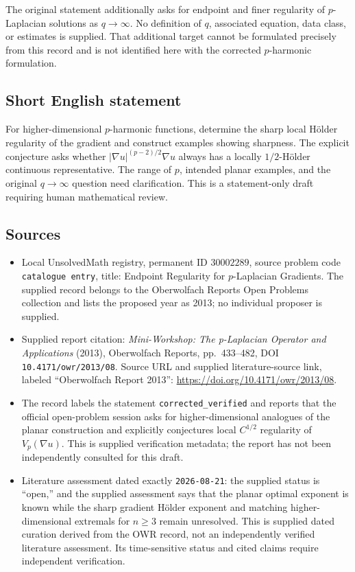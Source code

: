 \documentclass[11pt]{article}
\begin{document}
The original statement additionally asks for endpoint and finer regularity of \(p\)-Laplacian solutions as \(q\to\infty\). No definition of \(q\), associated equation, data class, or estimates is supplied. That additional target cannot be formulated precisely from this record and is not identified here with the corrected \(p\)-harmonic formulation.
\subsection{Short English statement}
For higher-dimensional \(p\)-harmonic functions, determine the sharp local H\"older regularity of the gradient and construct examples showing sharpness. The explicit conjecture asks whether \(|\nabla u|^{(p-2)/2}\nabla u\) always has a locally \(1/2\)-H\"older continuous representative. The range of \(p\), intended planar examples, and the original \(q\to\infty\) question need clarification. This is a statement-only draft requiring human mathematical review.
\subsection{Sources}
\begin{itemize}
\item Local UnsolvedMath registry, permanent ID \(30002289\), source problem code \texttt{catalogue entry}, title: Endpoint Regularity for \(p\)-Laplacian Gradients. The supplied record belongs to the Oberwolfach Reports Open Problems collection and lists the proposed year as 2013; no individual proposer is supplied.
\item Supplied report citation: \emph{Mini-Workshop: The p-Laplacian Operator and Applications} (2013), Oberwolfach Reports, pp.\ 433--482, DOI \texttt{10.4171/owr/2013/08}. Source URL and supplied literature-source link, labeled ``Oberwolfach Report 2013'': \url{https://doi.org/10.4171/owr/2013/08}.
\item The record labels the statement \texttt{corrected\_verified} and reports that the official open-problem session asks for higher-dimensional analogues of the planar construction and explicitly conjectures local \(C^{1/2}\) regularity of \(V_p(\nabla u)\). This is supplied verification metadata; the report has not been independently consulted for this draft.
\item Literature assessment dated exactly \texttt{2026-08-21}: the supplied status is ``open,'' and the supplied assessment says that the planar optimal exponent is known while the sharp gradient H\"older exponent and matching higher-dimensional extremals for \(n\geq3\) remain unresolved. This is supplied dated curation derived from the OWR record, not an independently verified literature assessment. Its time-sensitive status and cited claims require independent verification.
\end{itemize}
\end{document}
